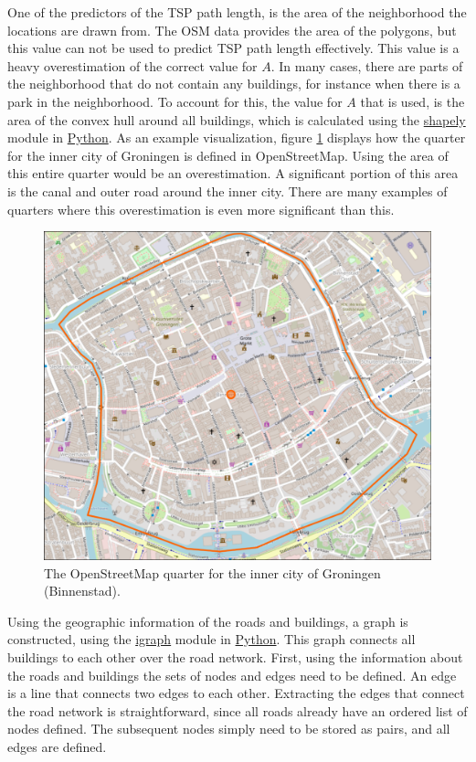 \documentclass[12pt]{article}
\numberwithin{equation}{section}
\newcommand{\1}[1]{\,I_{#1}} %
\begin{document}
One of the predictors of the TSP path length, is the area of the neighborhood
the locations are drawn from. The OSM data provides the area of the polygons,
but this value can not be used to predict TSP path length effectively.
This value is a heavy overestimation of the correct value for $A$.
In many cases, there are parts of the neighborhood that do not contain
any buildings, for instance when there is a park in the neighborhood. To
account for this, the value for $A$ that is used, is the area of the convex
hull around all buildings, which is calculated using the \url{shapely}
module in \url{Python}. As an example visualization, figure \ref{fig:binnenstad_quarter} displays
how the quarter for the inner city of Groningen is defined in OpenStreetMap. Using the area of this
entire quarter would be an overestimation. A significant portion of this area is the canal and outer
road around the inner city. There are many examples of quarters where this overestimation is even
more significant than this.
\begin{figure}[H]
  \caption{The OpenStreetMap quarter for the inner city of Groningen (Binnenstad). \citep{openstreetmap}}
  \label{fig:binnenstad_quarter}
  \includegraphics[width=\textwidth]{Pictures/Binnenstad_quarter.png}
\end{figure}
Using the geographic information of the roads and buildings, a graph
is constructed, using the \url{igraph} module in \url{Python}. This graph
connects all buildings to each other over the road network. First, using the information about the 
roads and buildings the sets of nodes and edges need to be defined. An edge is a line that connects
two edges to each other. Extracting the edges that connect the road network is straightforward,
since all roads already have an ordered list of nodes defined. The subsequent nodes simply need to
be stored as pairs, and all edges are defined.
\end{document}
